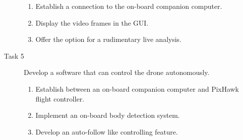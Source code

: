 \begin{description}
    \begin{enumerate}
        \item Establish a connection to the on-board companion computer.
        \item Display the video frames in the \acs*{GUI}.
        \item Offer the option for a rudimentary live analysis.
    \end{enumerate}
    \item[Task 5] Develop a software that can control the drone autonomously.
    \begin{enumerate}
        \item Establish between an on-board companion computer and PixHawk
        flight controller.
        \item Implement an on-board body detection system.
        \item Develop an auto-follow like controlling feature. 
    \end{enumerate}
\end{description}
